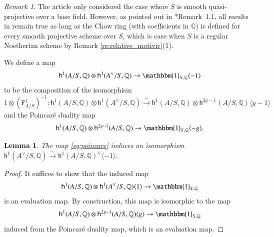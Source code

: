 \documentclass[12pt]{amsart}
\numberwithin{equation}{section}
\theoremstyle{plain}
\newtheorem{lem}[proposition]{Lemma}
\theoremstyle{definition}
\theoremstyle{remark}
\newtheorem{remark}[proposition]{Remark}
\renewcommand{\d}[1]{\mathbb{#1}}
\renewcommand{\sf}[1]{\mathsf{#1}}
\renewcommand{\(}{\left(}
\renewcommand{\)}{\right)}
\newcommand{\ang}[1]{\langle{#1}\rangle}
\newcommand{\dQ}{\d Q}
\newcommand{\sfh}{\sf h}
\newcommand{\tF}{\mathtt{F}}
\begin{document}
\begin{remark}\label{re:motivie_abelian}
The article \cite{DM91} only considered the case where $S$ is smooth quasi-projective over a base field. However, as pointed out in \cite{Kun94}*{Remark~1.1}, all results in \cite{DM91} remain true as long as the Chow ring (with coefficients in $\dQ$) is defined for every smooth projective scheme over $S$, which is case when $S$ is a regular Noetherian scheme by Remark \ref{re:relative_motivic}(1).
\end{remark}

We define a map
\begin{align}\label{eq:poincare}
\sfh^1(A/S,\dQ)\otimes\sfh^1(A^\vee/S,\dQ)\to\mathbbm{1}_{S,\dQ}\ang{-1}
\end{align}
to be the composition of the isomorphism
\[
1\otimes(\tF_{A/S}^1)^{-1}\colon\sfh^1(A/S,\dQ)\otimes\sfh^1(A^\vee/S,\dQ)
\xrightarrow\sim\sfh^1(A/S,\dQ)\otimes\sfh^{2g-1}(A/S,\dQ)\ang{g-1}
\]
and the Poincar\'{e} duality map
\[
\sfh^1(A/S,\dQ)\otimes\sfh^{2g-1}(A/S,\dQ)\to\mathbbm{1}_{S,\dQ}\ang{-g}.
\]


\begin{lem}\label{le:poincare}
The map \eqref{eq:poincare} induces an isomorphism $\sfh^1(A^\vee/S,\dQ)\xrightarrow\sim\sfh^1(A/S,\dQ)^\vee\ang{-1}$.
\end{lem}

\begin{proof}
It suffices to show that the induced map
\[
\sfh^1(A/S,\dQ)\otimes\sfh^1(A^\vee/S,\dQ)\ang{1}\to\mathbbm{1}_{S,\dQ}
\]
is an evaluation map. By construction, this map is isomorphic to the map
\[
\sfh^1(A/S,\dQ)\otimes\sfh^{2g-1}(A/S,\dQ)\ang{g}\to\mathbbm{1}_{S,\dQ}
\]
induced from the Poincar\'{e} duality map, which is an evaluation map.
\end{proof}
\end{document}

